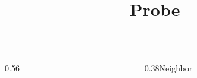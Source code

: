 \documentclass[8pt,aspectratio=169]{beamer}
\title{Probe}
\date{}
\begin{document}
\begin{frame}\begin{columns}[onlytextwidth,t]\begin{column}{0.56\textwidth}\begin{center}\end{center}\end{column}\begin{column}{0.38\textwidth}Neighbor\end{column}\end{columns}\end{frame}
\end{document}

